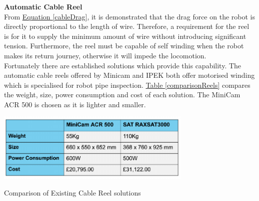 \documentclass[11pt]{article}		%
\newcommand{\equationref}[1]{\hyperref[#1]{Equation \ref*{#1}}}     %
\newcommand{\tableref}[1]{\hyperref[#1]{Table \ref*{#1}}}     %
\begin{document}
		    \textbf{Automatic Cable Reel}
	        \\
	        From \equationref{cableDrag}, it is demonstrated that the drag force on the robot is directly proportional to the length of wire. 
	        Therefore, a requirement for the reel is for it to supply the minimum amount of wire without introducing significant tension. 
	        Furthermore, the reel must be capable of self winding when the robot makes its return journey, otherwise it will impede the locomotion.
	        \\ 
	        \hspace*{3ex}Fortunately there are established solutions which provide this capability. 
	        The automatic cable reels offered by Minicam and IPEK both offer motorised winding which is specialised for robot pipe inspection. 
	        \tableref{comparisonReels} compares the weight, size, power consumption and cost of each solution. 
	        The MiniCam ACR 500 is chosen as it is lighter and smaller. 
	        \begin{table}[h]
				\centering
				\includegraphics[width=0.7\textwidth]{tablecables}
				\caption{Comparison of Existing Cable Reel solutions}
				\label{comparisonReels}
			\end{table}
\end{document}
